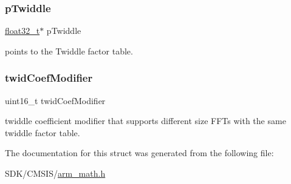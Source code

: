 \subsubsection{\texorpdfstring{p\+Twiddle}{pTwiddle}}
{\footnotesize\ttfamily \mbox{\hyperlink{arm__math_8h_a4611b605e45ab401f02cab15c5e38715}{float32\+\_\+t}}$\ast$ p\+Twiddle}

points to the Twiddle factor table. \mbox{\label{structarm__cfft__radix2__instance__f32_afe772e5b5001c9d8e85032115a8df5bf}} 
\subsubsection{\texorpdfstring{twid\+Coef\+Modifier}{twidCoefModifier}}
{\footnotesize\ttfamily uint16\+\_\+t twid\+Coef\+Modifier}

twiddle coefficient modifier that supports different size F\+F\+Ts with the same twiddle factor table. 

The documentation for this struct was generated from the following file\+:\begin{DoxyCompactItemize}
\item 
S\+D\+K/\+C\+M\+S\+I\+S/\mbox{\hyperlink{arm__math_8h}{arm\+\_\+math.\+h}}\end{DoxyCompactItemize}
